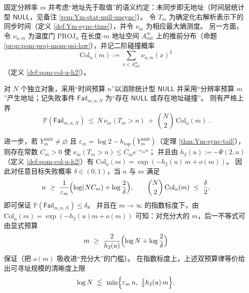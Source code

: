 \begin{theorem}\label{thm:spg-double-budget-address-capacity}
固定分辨率 \(m\) 并考虑“地址先于取值”的语义约定：未同步即无地址（时间层统计型 \(\mathsf{NULL}\)，见备注 \ref{rem:Ym-stat-null-unsync}）。
令 \(T_m\) 为确定化右解析表示下的同步时间（定义 \ref{def:Ym-sync-time}），并令 \(\nu_m\) 为相应最大熵测度。
另一方面，令 \(\nu_{u,m}\) 为温度门 \(\mathrm{PROJ}_u\) 在长度-\(m\) 地址空间 \(A_{\mathrm{out}}^m\) 上的推前分布（命题 \ref{prop:pom-proj-mom-psi-law}），并记二阶碰撞概率
\[
\mathrm{Col}_u(m):=\sum_{x\in A_{\mathrm{out}}^m}\nu_{u,m}(x)^2
\]
（定义 \ref{def:pom-col-u-h2}）。
\par
对 \(N\) 个独立对象，采用“时间预算 \(n\)”以消除统计型 \(\mathsf{NULL}\) 并采用“分辨率预算 \(m\)”产生地址；记失败事件 \(\mathsf{Fail}_{m,n,N}\) 为“存在 \(\mathsf{NULL}\) 或存在地址碰撞”。
则有严格上界
\begin{equation}\label{eq:spg-double-budget-fail-bound}
\boxed{\;
\mathbb{P}(\mathsf{Fail}_{m,n,N})
\ \le\
N\,\nu_m(T_m>n)\ +\ \binom{N}{2}\,\mathrm{Col}_u(m)\; }.
\end{equation}
\par
进一步，若 \(Y_m^{\mathrm{amb}}\neq\varnothing\) 且 \(\varepsilon_m=\log 2-h_{\mathrm{top}}(Y_m^{\mathrm{amb}})\)（定理 \ref{thm:Ym-sync-tail}），则存在常数 \(C_m>0\) 使 \(\nu_m(T_m>n)\le C_m e^{-\varepsilon_m n}\)；
并且由 \(h_2(u):=-\Psi(2,u)\)（定义 \ref{def:pom-col-u-h2}）有
\(
\mathrm{Col}_u(m)=\exp(-h_2(u)\,m+o(m))
\)。
因此对任意目标失败概率 \(\delta\in(0,1)\)，当 \(n\) 与 \(m\) 满足
\[
n\ \ge\ \frac{1}{\varepsilon_m}\Bigl(\log(NC_m)+\log\frac{2}{\delta}\Bigr),
\qquad
\binom{N}{2}\,\mathrm{Col}_u(m)\ \le\ \frac{\delta}{2},
\]
即可保证 \(\mathbb{P}(\mathsf{Fail}_{m,n,N})\le\delta\)。
并且在 \(m\to\infty\) 的指数标度下，由 \(\mathrm{Col}_u(m)=\exp(-h_2(u)m+o(m))\) 可知：对充分大的 \(m\)，后一不等式可由显式预算
\[
m\ \ge\ \frac{2}{h_2(u)}\Bigl(\log N+\log\frac{2}{\delta}\Bigr)
\]
保证（把 \(o(m)\) 吸收进“充分大”的门槛）。
在指数标度上，上述双预算律等价给出可寻址规模的清晰度上限
\[
\log N\ \lesssim\ \min\Bigl\{\varepsilon_m\,n,\ \tfrac12 h_2(u)\,m\Bigr\}.
\]
\end{theorem}

